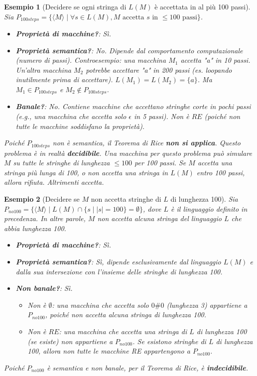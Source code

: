 \documentclass[a4paper]{article}
\newtheorem{example}{Esempio}
\begin{document}
\begin{example}[Decidere se ogni stringa di $L(M)$ è accettata in al più 100 passi]
Sia $P_{100steps} = \{\langle M \rangle \mid \forall s \in L(M), M \text{ accetta } s \text{ in } \le 100 \text{ passi}\}$.
\begin{itemize}
    \item \textbf{Proprietà di macchine?}: Sì.
    \item \textbf{Proprietà semantica?}: No. Dipende dal comportamento computazionale (numero di passi). Controesempio: una macchina $M_1$ accetta "a" in 10 passi. Un'altra macchina $M_2$ potrebbe accettare "a" in 200 passi (es. loopando inutilmente prima di accettare). $L(M_1) = L(M_2) = \{a\}$. Ma $M_1 \in P_{100steps}$ e $M_2 \notin P_{100steps}$.
    \item \textbf{Banale?}: No. Contiene macchine che accettano stringhe corte in pochi passi (e.g., una macchina che accetta solo $\epsilon$ in 5 passi). Non è $RE$ (poiché non tutte le macchine soddisfano la proprietà).
\end{itemize}
Poiché $P_{100steps}$ non è semantica, il Teorema di Rice \textbf{non si applica}. Questo problema è in realtà \textbf{decidibile}. Una macchina per questo problema può simulare $M$ su tutte le stringhe di lunghezza $\le 100$ per 100 passi. Se $M$ accetta una stringa più lunga di 100, o non accetta una stringa in $L(M)$ entro 100 passi, allora rifiuta. Altrimenti accetta.
\end{example}

\begin{example}[Decidere se $M$ non accetta stringhe di $L$ di lunghezza 100]
Sia $P_{no100} = \{\langle M \rangle \mid L(M) \cap \{s \mid |s|=100\} = \emptyset\}$, dove $L$ è il linguaggio definito in precedenza. In altre parole, $M$ non accetta alcuna stringa del linguaggio $L$ che abbia lunghezza 100.
\begin{itemize}
    \item \textbf{Proprietà di macchine?}: Sì.
    \item \textbf{Proprietà semantica?}: Sì, dipende esclusivamente dal linguaggio $L(M)$ e dalla sua intersezione con l'insieme delle stringhe di lunghezza 100.
    \item \textbf{Non banale?}: Sì.
    \begin{itemize}
        \item Non è $\emptyset$: una macchina che accetta solo $0\#0$ (lunghezza 3) appartiene a $P_{no100}$, poiché non accetta alcuna stringa di lunghezza 100.
        \item Non è $RE$: una macchina che accetta una stringa di $L$ di lunghezza 100 (se esiste) non appartiene a $P_{no100}$. Se esistono stringhe di $L$ di lunghezza 100, allora non tutte le macchine RE appartengono a $P_{no100}$.
    \end{itemize}
\end{itemize}
Poiché $P_{no100}$ è semantica e non banale, per il Teorema di Rice, è \textbf{indecidibile}.
\end{example}
\end{document}
